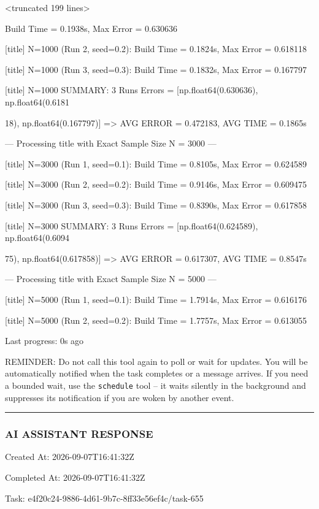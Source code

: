 \documentclass[11pt,a4paper]{article}
\begin{document}
<truncated 199 lines>

Build Time = 0.1938s, Max Error = 0.630636

[title] N=1000 (Run 2, seed=0.2): Build Time = 0.1824s, Max Error = 0.618118

[title] N=1000 (Run 3, seed=0.3): Build Time = 0.1832s, Max Error = 0.167797

[title] N=1000 SUMMARY: 3 Runs Errors = [np.float64(0.630636), np.float64(0.6181

18), np.float64(0.167797)] => AVG ERROR = 0.472183, AVG TIME = 0.1865s

--- Processing title with Exact Sample Size N = 3000 ---

[title] N=3000 (Run 1, seed=0.1): Build Time = 0.8105s, Max Error = 0.624589

[title] N=3000 (Run 2, seed=0.2): Build Time = 0.9146s, Max Error = 0.609475

[title] N=3000 (Run 3, seed=0.3): Build Time = 0.8390s, Max Error = 0.617858

[title] N=3000 SUMMARY: 3 Runs Errors = [np.float64(0.624589), np.float64(0.6094

75), np.float64(0.617858)] => AVG ERROR = 0.617307, AVG TIME = 0.8547s

--- Processing title with Exact Sample Size N = 5000 ---

[title] N=5000 (Run 1, seed=0.1): Build Time = 1.7914s, Max Error = 0.616176

[title] N=5000 (Run 2, seed=0.2): Build Time = 1.7757s, Max Error = 0.613055


Last progress: 0s ago



REMINDER: Do not call this tool again to poll or wait for updates. You will be automatically notified when the task completes or a message arrives. If you need a bounded wait, use the \texttt{schedule} tool -- it waits silently in the background and suppresses its notification if you are woken by another event.


\hrule

\subsubsection{AI ASSISTANT RESPONSE}

Created At: 2026-09-07T16:41:32Z

Completed At: 2026-09-07T16:41:32Z

Task: e4f20c24-9886-4d61-9b7c-8ff33e56ef4c/task-655
\end{document}
